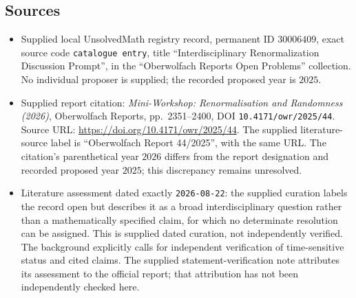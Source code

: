 \documentclass[11pt]{article}
\begin{document}
\subsection{Sources}
\begin{itemize}
\item Supplied local UnsolvedMath registry record, permanent ID \(30006409\), exact source code \texttt{catalogue entry}, title ``Interdisciplinary Renormalization Discussion Prompt'', in the ``Oberwolfach Reports Open Problems'' collection. No individual proposer is supplied; the recorded proposed year is \(2025\).
\item Supplied report citation: \emph{Mini-Workshop: Renormalisation and Randomness (2026)}, Oberwolfach Reports, pp.~2351--2400, DOI \texttt{10.4171/owr/2025/44}. Source URL: \url{https://doi.org/10.4171/owr/2025/44}. The supplied literature-source label is ``Oberwolfach Report 44/2025'', with the same URL. The citation's parenthetical year \(2026\) differs from the report designation and recorded proposed year \(2025\); this discrepancy remains unresolved.
\item Literature assessment dated exactly \texttt{2026-08-22}: the supplied curation labels the record open but describes it as a broad interdisciplinary question rather than a mathematically specified claim, for which no determinate resolution can be assigned. This is supplied dated curation, not independently verified. The background explicitly calls for independent verification of time-sensitive status and cited claims. The supplied statement-verification note attributes its assessment to the official report; that attribution has not been independently checked here.
\end{itemize}
\end{document}
